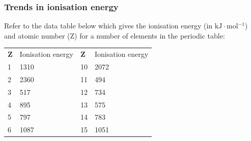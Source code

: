             \subsubsection{ Trends in ionisation energy}
            \nopagebreak
            \label{m38757*id261960}Refer to the data table below which gives the ionisation energy (in $\mathrm{kJ}\ensuremath{\cdot}\mathrm{mol}{}^{-1}$) and atomic number (Z) for a number of elements in the periodic table:
          \begin{table}[H]
        \begin{center}
      \label{m38757*id261984}
    \noindent
      \tablelasttail{}
      \begin{xtabular}[t]{|l|l|l|l|}\hline
                  \textbf{Z}
                 &
        Ionisation energy &
                  \textbf{Z}
                 &
        Ionisation energy%
     \tabularnewline{}
        1 &
        1310 &
        10 &
        2072%
     \tabularnewline{}
        2 &
        2360 &
        11 &
        494%
     \tabularnewline{}
        3 &
        517 &
        12 &
        734%
     \tabularnewline{}
        4 &
        895 &
        13 &
        575%
     \tabularnewline{}
        5 &
        797 &
        14 &
        783%
     \tabularnewline{}
        6 &
        1087 &
        15 &
        1051%

\end{xtabular}
\end{center}
\end{table}
